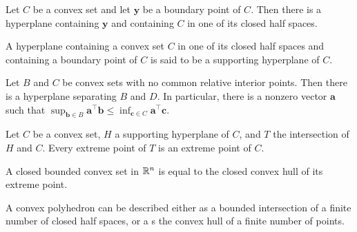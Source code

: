 \begin{theorem}
Let $C$ be a convex set and let $\mathbf{y}$ be a boundary point of $C$. Then there is a hyperplane containing $\mathbf{y}$ and containing $C$ in one of its closed half spaces. 
\end{theorem}

\begin{definition}
A hyperplane containing a convex set $C$ in one of its closed half spaces and containing a boundary point of $C$ is said to be a supporting hyperplane of $C$.
\end{definition}

\begin{theorem}
Let $B$ and $C$ be convex sets with no common relative interior points. Then there is a hyperplane separating $B$ and $D$. In particular, there is a nonzero vector $\mathbf{a}$ such that $\sup_{\mathbf{b}\in B}\mathbf{a}^\top \mathbf{b}\leq \inf_{\mathbf{c}\in C} \mathbf{a}^\top \mathbf{c}$. 
\end{theorem}

\begin{theorem}
	Let $C$ be a convex set, $H$ a supporting hyperplane of $C$, and $T$ the intersection of $H$ and $C$. Every extreme point of $T$ is an extreme point of $C$.
\end{theorem}

\begin{theorem}
A closed bounded convex set in $\mathbb{R}^n$ is equal to the closed convex hull of its extreme point.
\end{theorem}

\begin{theorem}
A convex polyhedron can be described either as a bounded intersection of a finite number of closed half spaces, or a s the convex hull of a finite number of points. 
\end{theorem}